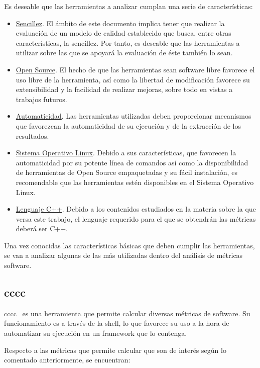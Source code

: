 \documentclass[11pt]{article}
\begin{document}
Es deseable que las herramientas a analizar cumplan una serie de características:

\begin{itemize}
\item{\underline{Sencillez}}. El ámbito de este documento implica tener que realizar la evaluación de un modelo de calidad establecido que busca, entre otras características, la sencillez. Por tanto, es deseable que las herramientas a utilizar sobre las que se apoyará la evaluación de éste también lo sean.
\item{\underline{Open Source}}. El hecho de que las herramientas sean software libre favorece el uso libre de la herramienta, así como la libertad de modificación favorece su extensibilidad y la facilidad de realizar mejoras, sobre todo en vistas a trabajos futuros.
\item{\underline{Automaticidad}}. Las herramientas utilizadas deben proporcionar mecanismos que favorezcan la automaticidad de su ejecución y de la extracción de los resultados.
\item{\underline{Sistema Operativo Linux}}. Debido a sus características, que favorecen la automaticidad por su potente línea de comandos así como la disponibilidad de herramientas de Open Source empaquetadas y su fácil instalación, es recomendable que las herramientas estén disponibles en el Sistema Operativo Linux.
\item{\underline{Lenguaje C++}}. Debido a los contenidos estudiados en la materia sobre la que versa este trabajo, el lenguaje requerido para el que se obtendrán las métricas deberá ser C++.
\end{itemize}

Una vez conocidas las características básicas que deben cumplir las herramientas, se van a analizar algunas de las más utilizadas dentro del análisis de métricas software.

\subsection{cccc}

cccc~\cite{metrictools:cccc} es una herramienta que permite calcular diversas métricas de software. Su funcionamiento es a través de la shell, lo que favorece su uso a la hora de automatizar su ejecución en un framework que lo contenga.

Respecto a las métricas que permite calcular que son de interés según lo comentado anteriormente, se encuentran:
\end{document}
